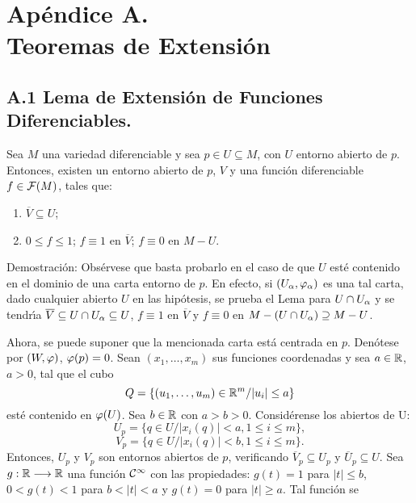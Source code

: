\documentclass[cursovd_portada.tex]{subfiles}
\begin{document}
\chapter*{Ap\'endice A.\\Teoremas de Extensi\'on}
\section*{A.1 Lema de Extensi\'{o}n de Funciones Diferenciables.}
\begin{lemaap}
Sea $M$ una variedad diferenciable y sea $p\in U\subseteq M$, con $U$ entorno abierto de $p$. Entonces, existen un
entorno abierto de $p$, $V$ y una funci\'{o}n diferenciable $f\in {\cal F}(M)$, tales que:
\begin{enumerate}
\item $\overline{V}\subseteq U$;
\item $0\leq f\leq 1$; $f\equiv 1$ en $\overline{V}$; $f\equiv 0$ en $M-U$.
\end{enumerate}
\end{lemaap}
{\sc Demostraci\'{o}n:} Obs\'{e}rvese que basta probarlo en el caso de que $U$ est\'{e} contenido en el dominio de una carta
entorno de $p$. En efecto, si $(U_{\alpha}, \varphi_{\alpha})$ es una tal carta, dado cualquier abierto $U$ en las hip\'{o}tesis,
se prueba el Lema para $U\cap U_{\alpha}$ y se tendr\'{\i}a $\overline{V} \subseteq U\cap U_{\alpha}\subseteq U$, $f\equiv 1$
en $\overline{V}$ y $f\equiv 0$ en $M-(U\cap U_{\alpha})\supseteq M-U$.
\par
Ahora, se puede suponer que la mencionada carta est\'{a} centrada en $p$. De\-n\'{o}\-te\-se por $(W,\varphi)$, $\varphi (p)=0$.
Sean $(x_1,\dots ,x_m)$ sus funciones coordenadas y sea $a\in \mathbb{R}$, $a>0$, tal que el cubo
$$Q=\{(u_1,\dots ,u_m)\in \mathbb{R}^m /\vert u_i \vert\leq a\}$$
est\'{e} contenido en $\varphi (U)$. Sea $b\in\mathbb{R}$ con $a>b>0$. Consid\'{e}rense los abiertos de U:
$$U_p=\{q\in U/\vert x_i(q) \vert <a,1\leq i\leq m\},$$
$$V_p=\{q\in U/\vert x_i(q) \vert <b,1\leq i\leq m\}.$$
\hs Entonces, $U_p$ y $V_p$ son entornos abiertos de $p$, verificando $\overline{V}_p\subseteq U_p$ y
$\overline{U}_p\subseteq U$. Sea $g:\mathbb{R}\longrightarrow \mathbb{R}$ una funci\'{o}n ${\cal C}^{\infty}$  con las propiedades: $g(t)=1$ para
$\vert t \vert\leq b$, $0<g(t)<1$ para $b<\vert t\vert <a$ y $g(t)=0$ para $\vert t \vert\geq a$. Tal funci\'{o}n se
\end{document}

